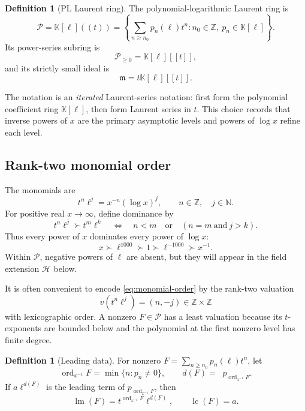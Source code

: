 \documentclass[11pt,oneside]{article}
\numberwithin{equation}{section}
\theoremstyle{definition}
\newtheorem{definition}[theorem]{Definition}
\newcommand{\K}{\mathbb K}
\newcommand{\Z}{\mathbb Z}
\newcommand{\N}{\mathbb N}
\newcommand{\PL}{\mathscr P}
\newcommand{\HL}{\mathscr H}
\newcommand{\ordx}{\operatorname{ord}_{x^{-1}}}
\newcommand{\lc}{\operatorname{lc}}
\DeclareMathOperator{\degell}{deg_{\ell}}
\begin{document}
\begin{definition}[PL Laurent ring]
The polynomial-logarithmic Laurent ring is
\begin{equation}\label{eq:PL-ring}
  \PL=\K[\ell]((t))
  =\left\{\sum_{n\ge n_0}p_n(\ell)t^n:
      n_0\in\Z,\ p_n\in\K[\ell]\right\}.
\end{equation}
Its power-series subring is
\[
  \PL_{\ge0}=\K[\ell][[t]],
\]
and its strictly small ideal is
\[
  \mathfrak m=t\K[\ell][[t]].
\]
\end{definition}

The notation is an \emph{iterated} Laurent-series notation: first form the
polynomial coefficient ring \(\K[\ell]\), then form Laurent series in \(t\).
This choice records that inverse powers of \(x\) are the primary asymptotic
levels and powers of \(\log x\) refine each level.

\subsection{Rank-two monomial order}

The monomials are
\[
  t^n\ell^j=x^{-n}(\log x)^j,
  \qquad n\in\Z,\quad j\in\N.
\]
For positive real \(x\to\infty\), define dominance by
\begin{equation}\label{eq:monomial-order}
  t^n\ell^j\succ t^m\ell^k
  \quad\Longleftrightarrow\quad
  n<m\quad\text{or}\quad(n=m\ \text{and}\ j>k).
\end{equation}
Thus every power of \(x\) dominates every power of \(\log x\):
\[
  x\succ \ell^{1000}\succ1\succ \ell^{-1000}\succ x^{-1}.
\]
Within \(\PL\), negative powers of \(\ell\) are absent, but they will appear in
the field extension \(\HL\) below.

It is often convenient to encode \eqref{eq:monomial-order} by the rank-two
valuation
\begin{equation}\label{eq:valuation-pair}
  v(t^n\ell^j)=(n,-j)\in\Z\times\Z
\end{equation}
with lexicographic order.  A nonzero \(F\in\PL\) has a least valuation because
its \(t\)-exponents are bounded below and the polynomial at the first nonzero
level has finite degree.

\begin{definition}[Leading data]
For nonzero
\(F=\sum_{n\ge n_0}p_n(\ell)t^n\), let
\[
  \ordx F=\min\{n:p_n\ne0\},\qquad
  d(F)=\degell p_{\ordx F}.
\]
If \(a\ell^{d(F)}\) is the leading term of
\(p_{\ordx F}\), then
\[
  \operatorname{lm}(F)=t^{\ordx F}\ell^{d(F)},\qquad
  \lc(F)=a.
\]
\end{definition}
\end{document}
